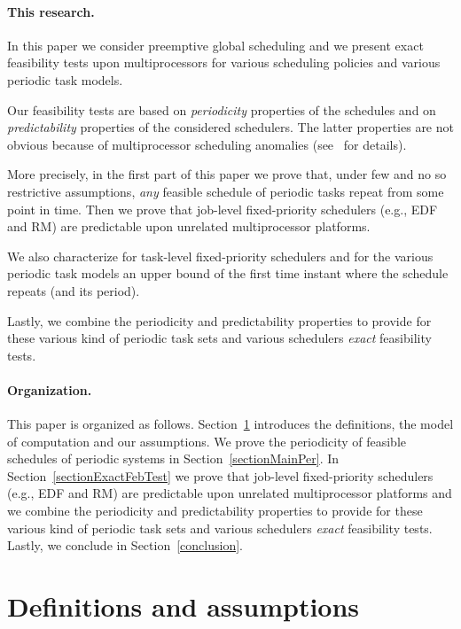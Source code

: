 \documentclass[a4paper,11pt]{article}
\newcommand{\EDF}{\textrm{EDF}}
\newcommand{\RM}{\textrm{RM}}
\begin{document}
\paragraph{This research.} In this paper we consider
preemptive global scheduling and we present exact
feasibility tests upon multiprocessors for various scheduling
policies and various periodic task models.

Our feasibility tests are based on \emph{periodicity}
properties of the schedules and on \emph{predictability}
properties of the considered schedulers. The latter
properties are not obvious because of multiprocessor
scheduling anomalies (see~\cite{Ha} for details).

More precisely, in the first part of this paper we
prove that, under few and no so restrictive assumptions,
\emph{any} feasible schedule of periodic tasks repeat from some point
in time. Then we prove that job-level fixed-priority
schedulers (e.g., \EDF{}  and \RM) are predictable upon unrelated multiprocessor platforms.

We also characterize for task-level fixed-priority schedulers and for the various periodic task models an upper bound of the first time instant where the schedule
repeats (and its period).

Lastly, we combine the periodicity and predictability
properties to provide for these various kind of periodic
task sets and various schedulers \emph{exact} feasibility tests.

\paragraph{Organization.} This paper is organized as follows. Section~\ref{model} introduces the definitions, the model of computation and our assumptions. We prove the periodicity of feasible schedules of periodic systems in Section~\ref{sectionMainPer}. In Section~\ref{sectionExactFebTest} we prove that job-level fixed-priority schedulers (e.g., \EDF{}  and \RM) are predictable upon unrelated multiprocessor platforms and we combine the periodicity and predictability
properties to provide for these various kind of periodic  task sets and various schedulers \emph{exact} feasibility tests. Lastly, we conclude in Section~\ref{conclusion}.

\section{Definitions and assumptions}\label{model}
\end{document}

